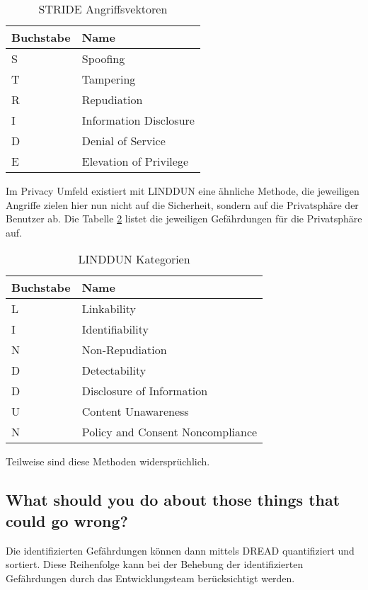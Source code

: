 \begin{table}
	\begin{center}
\begin{tabular}{lp{5cm}}
	\toprule
	Buchstabe & Name\\ \midrule
	S & Spoofing \\
	T & Tampering \\
	R & Repudiation \\
	I & Information Disclosure \\
	D & Denial of Service \\
	E & Elevation of Privilege \\
	\bottomrule
\end{tabular}
	\caption{STRIDE Angriffsvektoren}
	\label{tbl:stride}
\end{center}
\end{table}

Im Privacy Umfeld existiert mit LINDDUN eine ähnliche Methode, die jeweiligen Angriffe zielen hier nun nicht auf die Sicherheit, sondern auf die Privatsphäre der Benutzer ab. Die Tabelle \ref{tbl:linddun} listet die jeweiligen Gefährdungen für die Privatsphäre auf.

\begin{table}
	\begin{center}
\begin{tabular}{lp{5cm}}
	\toprule
	Buchstabe & Name\\
	\midrule
	L & Linkability \\
	I & Identifiability \\
	N & Non-Repudiation \\
	D & Detectability \\
	D & Disclosure of Information \\
	U & Content Unawareness \\
	N & Policy and Consent Noncompliance \\
	\bottomrule
\end{tabular}
	\caption{LINDDUN Kategorien}
	\label{tbl:linddun}
\end{center}
\end{table}

Teilweise sind diese Methoden widersprüchlich.

\subsection{What should you do about those things that could go wrong?}

Die identifizierten Gefährdungen können dann mittels DREAD quantifiziert und sortiert. Diese Reihenfolge kann bei der Behebung der identifizierten Gefährdungen durch das Entwicklungsteam berücksichtigt werden.

